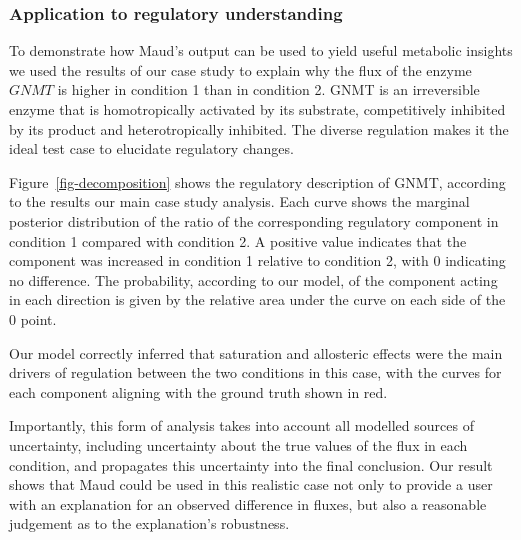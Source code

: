\documentclass[journal=asbcd6,manuscript=article,layout=traditional]{achemso}
\begin{document}
\hypertarget{application-to-regulatory-understanding}{%
\subsubsection{Application to regulatory
understanding}\label{application-to-regulatory-understanding}}

To demonstrate how Maud's output can be used to yield useful metabolic
insights we used the results of our case study to explain why the flux
of the enzyme \(GNMT\) is higher in condition 1 than in condition 2.
GNMT is an irreversible enzyme that is homotropically activated by its
substrate, competitively inhibited by its product and heterotropically
inhibited. The diverse regulation makes it the ideal test case to
elucidate regulatory changes.

Figure~\ref{fig-decomposition} shows the regulatory description of GNMT,
according to the results our main case study analysis. Each curve shows
the marginal posterior distribution of the ratio of the corresponding
regulatory component in condition 1 compared with condition 2. A
positive value indicates that the component was increased in condition 1
relative to condition 2, with 0 indicating no difference. The
probability, according to our model, of the component acting in each
direction is given by the relative area under the curve on each side of
the 0 point.

Our model correctly inferred that saturation and allosteric effects were
the main drivers of regulation between the two conditions in this case,
with the curves for each component aligning with the ground truth shown
in red.

Importantly, this form of analysis takes into account all modelled
sources of uncertainty, including uncertainty about the true values of
the flux in each condition, and propagates this uncertainty into the
final conclusion. Our result shows that Maud could be used in this
realistic case not only to provide a user with an explanation for an
observed difference in fluxes, but also a reasonable judgement as to the
explanation's robustness.
\end{document}
